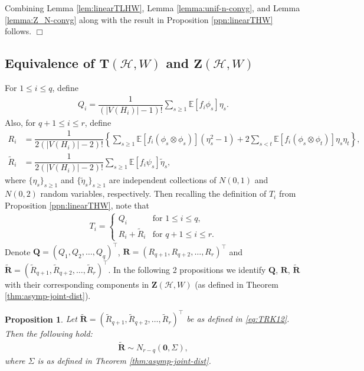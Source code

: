 \documentclass[11pt,reqno]{amsart}
\numberwithin{equation}{section}
\newcommand{\cH}{{\mathcal H}}
\newtheorem{prop}{Proposition}[section]
\theoremstyle{definition}
\begin{document}
Combining Lemma \ref{lem:linearTLHW}, Lemma \ref{lemma:unif-n-convg}, and Lemma \ref{lemma:Z_N-convg} along with 
\cite[Lemma 6]{janson1991asymptotic} the result in Proposition \ref{ppn:linearTHW} follows. \hfill $\Box$


\subsection{Equivalence of \texorpdfstring{$\bm{T}$}{T}$(\mathcal{H}, W)$ and \texorpdfstring{$\bm{Z}$}{Z}$(\mathcal{H}, W)$} 
\label{sec:equivalenceasymptoticdistribution}

For $1 \leq i \leq q$, define  
\begin{align}\label{eq:TQ}
Q_i  = \dfrac{1}{(|V(H_{i})|-1)!} \sum_{s \geq 1}\mathbb{E}\left[f_{i}\phi_{s}\right]\eta_{s} . 
 \end{align}
Also, for $q+1 \leq i \leq r$, define 
\begin{align}\label{eq:TRE12}
R_i & = \dfrac{ 1 }{2(|V(H_{i})|-2)!} \left\{ \sum_{s \geq 1}\mathbb{E}\left[f_{i}(\phi_{s}\otimes\phi_{s})\right]\left(\eta_{s}^2 - 1\right) + 2\sum_{s < t }\mathbb{E}\left[f_{i} (\phi_{s}\otimes\phi_{t})\right]\eta_{s}\eta_{t} \right\} ,  \\ 
\tilde R_i & = \dfrac{ 1 }{2(|V(H_{i})|-2)!} \sum_{s \geq 1}\mathbb{E}\left[f_{i}\psi_{s}\right]\tilde \eta_{s} , \label{eq:TRK12} 
\end{align}  
where $\{\eta_{s}\}_{s \geq 1}$ and $\{\tilde \eta_{s}\}_{s \geq 1}$ are independent collections of $N(0, 1)$ and $N(0, 2)$ random variables, respectively. Then recalling the definition of $T_i$ from Proposition \ref{ppn:linearTHW}, note that  
\begin{align*}
T_i  =  \left\{
\begin{array}{cc} 
Q_i  & \text{for } 1 \leq i \leq q , \\ 
R_i + \tilde R_i & \text{for } q+1 \leq i \leq r . 
\end{array} 
\right. 
\end{align*}  
Denote $\bm Q = (Q_1, Q_2, \ldots, Q_q)^\top$, $\bm R = (R_{q+1}, R_{q+2}, \ldots, R_r)^\top$ and $\tilde{\bm R} = (\tilde R_{q+1}, \tilde R_{q+2}, \ldots, \tilde R_r)^\top$.
In the following 2 propositions we identify $\bm Q$, $\bm R$, $\tilde{\bm R}$ with their corresponding components in $\bm Z(\cH, W)$ (as defined in Theorem \ref{thm:asymp-joint-dist}). 

\begin{prop}\label{ppn:R}
Let $\tilde {\bm R} = (\tilde R_{q+1}, \tilde R_{q+2}, \ldots, \tilde R_r)^\top$ be as defined in \eqref{eq:TRK12}. Then the following hold: 
\begin{align*}
  \tilde{\bm R} \sim N_{r-q}\left(\bm{0},\Sigma\right) , 
\end{align*}
where $\Sigma$ is as defined in Theorem \ref{thm:asymp-joint-dist}.
\end{prop}
\end{document}
